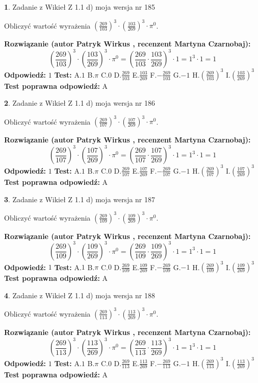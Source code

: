 \documentclass[12pt, a4paper]{article}
\theoremstyle{definition} %
\newtheorem{zad}{}
\newcommand{\zadStart}[1]{\begin{zad}#1\newline}
\newcommand{\zadStop}{\end{zad}}
\newcommand{\rozwStart}[2]{\noindent \textbf{Rozwiązanie (autor #1 , recenzent #2): }\newline}
\newcommand{\rozwStop}{\newline}
\newcommand{\odpStart}{\noindent \textbf{Odpowiedź:}\newline}
\newcommand{\odpStop}{\newline}
\newcommand{\testStart}{\noindent \textbf{Test:}\newline}
\newcommand{\testStop}{\newline}
\newcommand{\kluczStart}{\noindent \textbf{Test poprawna odpowiedź:}\newline}
\newcommand{\kluczStop}{\newline}
\begin{document}
\zadStart{Zadanie z Wikieł Z 1.1 d) moja wersja nr 185}

Obliczyć wartość wyrażenia $(\frac{269}{103})^{3} \cdot (\frac{103}{269})^{3} \cdot \pi^{0}$.
\zadStop
\rozwStart{Patryk Wirkus}{Martyna Czarnobaj}
$$(\frac{269}{103})^{3} \cdot (\frac{103}{269})^{3} \cdot \pi^{0} = (\frac{269}{103} \cdot \frac{103}{269})^{3} \cdot 1 = 1^{3} \cdot 1 = 1$$
\rozwStop
\odpStart
$1$
\odpStop
\testStart
A.$1$ B.$\pi$ C.$0$ D.$\frac{269}{103}$ E.$\frac{103}{269}$
F.$-\frac{269}{103}$ G.$-1$
H.$(\frac{269}{103})^{3}$
I.$(\frac{103}{269})^{3}$
\testStop
\kluczStart
A
\kluczStop



\zadStart{Zadanie z Wikieł Z 1.1 d) moja wersja nr 186}

Obliczyć wartość wyrażenia $(\frac{269}{107})^{3} \cdot (\frac{107}{269})^{3} \cdot \pi^{0}$.
\zadStop
\rozwStart{Patryk Wirkus}{Martyna Czarnobaj}
$$(\frac{269}{107})^{3} \cdot (\frac{107}{269})^{3} \cdot \pi^{0} = (\frac{269}{107} \cdot \frac{107}{269})^{3} \cdot 1 = 1^{3} \cdot 1 = 1$$
\rozwStop
\odpStart
$1$
\odpStop
\testStart
A.$1$ B.$\pi$ C.$0$ D.$\frac{269}{107}$ E.$\frac{107}{269}$
F.$-\frac{269}{107}$ G.$-1$
H.$(\frac{269}{107})^{3}$
I.$(\frac{107}{269})^{3}$
\testStop
\kluczStart
A
\kluczStop



\zadStart{Zadanie z Wikieł Z 1.1 d) moja wersja nr 187}

Obliczyć wartość wyrażenia $(\frac{269}{109})^{3} \cdot (\frac{109}{269})^{3} \cdot \pi^{0}$.
\zadStop
\rozwStart{Patryk Wirkus}{Martyna Czarnobaj}
$$(\frac{269}{109})^{3} \cdot (\frac{109}{269})^{3} \cdot \pi^{0} = (\frac{269}{109} \cdot \frac{109}{269})^{3} \cdot 1 = 1^{3} \cdot 1 = 1$$
\rozwStop
\odpStart
$1$
\odpStop
\testStart
A.$1$ B.$\pi$ C.$0$ D.$\frac{269}{109}$ E.$\frac{109}{269}$
F.$-\frac{269}{109}$ G.$-1$
H.$(\frac{269}{109})^{3}$
I.$(\frac{109}{269})^{3}$
\testStop
\kluczStart
A
\kluczStop



\zadStart{Zadanie z Wikieł Z 1.1 d) moja wersja nr 188}

Obliczyć wartość wyrażenia $(\frac{269}{113})^{3} \cdot (\frac{113}{269})^{3} \cdot \pi^{0}$.
\zadStop
\rozwStart{Patryk Wirkus}{Martyna Czarnobaj}
$$(\frac{269}{113})^{3} \cdot (\frac{113}{269})^{3} \cdot \pi^{0} = (\frac{269}{113} \cdot \frac{113}{269})^{3} \cdot 1 = 1^{3} \cdot 1 = 1$$
\rozwStop
\odpStart
$1$
\odpStop
\testStart
A.$1$ B.$\pi$ C.$0$ D.$\frac{269}{113}$ E.$\frac{113}{269}$
F.$-\frac{269}{113}$ G.$-1$
H.$(\frac{269}{113})^{3}$
I.$(\frac{113}{269})^{3}$
\testStop
\kluczStart
A
\kluczStop
\end{document}
